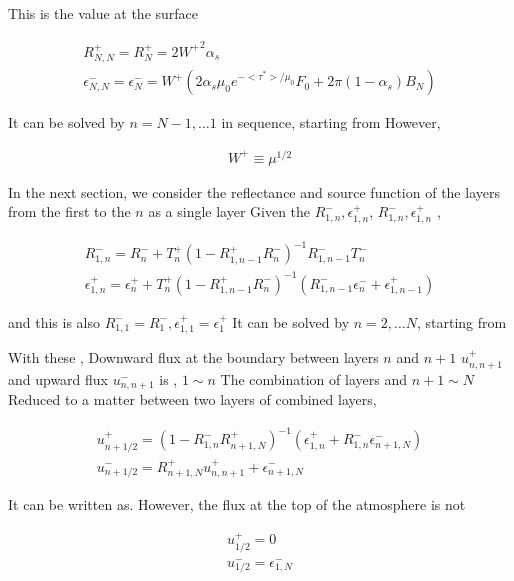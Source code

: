 This is the value at the surface

\begin{eqnarray}
  R^+_{N,N}  =   R^+_N = 2 {W^+}^2 \alpha_s \\
  \epsilon^-_{N,N}  =   \epsilon^-_N 
    = W^+ \left( 2 \alpha_s \mu_0 e^{-<\tau^*>/\mu_0} F_0 
                 + 2 \pi (1-\alpha_s) B_N 
          \right)
\end{eqnarray}

It can be solved by \(n=N-1, \ldots 1\) in sequence, starting from
However,

\begin{eqnarray}
  W^+ \equiv \mu^{1/2}
\end{eqnarray}

In the next section, we consider the reflectance and source function of
the layers from the first to the \(n\) as a single layer Given the
\(R^-_{1,n}, \epsilon^+_{1,n}\), \(R^-_{1,n}, \epsilon^+_{1,n}\) ,

\begin{eqnarray}
  R^-_{1,n}  =  R^-_n 
      + T^+_n ( 1- R^+_{1,n-1} R^-_n )^{-1} R^-_{1,n-1} T^-_n \\
  \epsilon^+_{1,n}  =  \epsilon^+_n
    + T^+_n ( 1- R^+_{1,n-1} R^-_n )^{-1} 
      ( R^-_{1,n-1} \epsilon^-_n + \epsilon^+_{1,n-1} ) 
\end{eqnarray}

and this is also \(R^-_{1,1} = R^-_1, \epsilon^+_{1,1} = \epsilon^+_1\)
It can be solved by \(n=2, \ldots N\), starting from

With these , Downward flux at the boundary between layers \(n\) and
\(n+1\) \(u^+_{n,n+1}\) and upward flux \(u^-_{n,n+1}\) is , \(1\sim n\)
The combination of layers and \(n+1\sim N\) Reduced to a matter between
two layers of combined layers,

\begin{eqnarray}
 u^+_{n+1/2} = (1-R^-_{1,n} R^+_{n+1,N})^{-1}
    (\epsilon^+_{1,n} + R^-_{1,n} \epsilon^-_{n+1,N} ) \\
 u^-_{n+1/2} = R^+_{n+1,N}  u^+_{n,n+1} + \epsilon^-_{n+1,N}
\end{eqnarray}

It can be written as. However, the flux at the top of the atmosphere is
not

\begin{eqnarray}
 u^+_{1/2}  =  0 \\
 u^-_{1/2}  =  \epsilon^-_{1,N}
\end{eqnarray}


